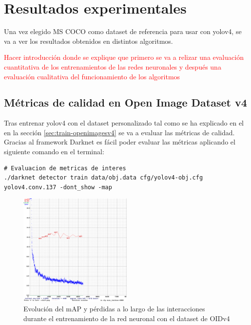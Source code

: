 \section{Resultados experimentales}
\label{sec:resultados-experimentales}

Una vez elegido MS COCO como dataset de referencia para usar con \gls{yolov4}, se va a ver los resultados obtenidos en distintos algoritmos.

\textcolor{red}{Hacer introducción donde se explique que primero se va a relizar una evaluación cuantitativa de los entrenamientos de las redes neuronales y después una evaluación cualitativa del funcionamiento de los algoritmos}

\subsection{Métricas de calidad en Open Image Dataset v4}
\label{subsec:metricas-calidad-openimagesv4}

Tras entrenar \gls{yolov4} con el dataset personalizado tal como se ha explicado en el en la sección \ref{sec:train-openimagesv4} se va a evaluar las métricas de calidad. Gracias al framework Darknet \cite{darknet13} es fácil poder evaluar las métricas aplicando el siguiente comando en el terminal:

\vspace{0.5cm}
\begin{lstlisting}[language=iPython,caption=Evaluación métricas de calidad del dataset utilizado para el entrenamiento de la red neuronal de detección de objetos,captionpos=b,label={lst:darknet-map}]
# Evaluacion de metricas de interes
./darknet detector train data/obj.data cfg/yolov4-obj.cfg yolov4.conv.137 -dont_show -map
\end{lstlisting}

\begin{figure}[ht]
\centering
\includegraphics[width=0.5\textwidth]{img/chapters/resultados/metricas/chart_train.png}
\caption{\label{fig:chart-train}Evolución del mAP y pérdidas a lo largo de las interacciones durante el entrenamiento de la red neuronal con el dataset de OIDv4}
\end{figure}

